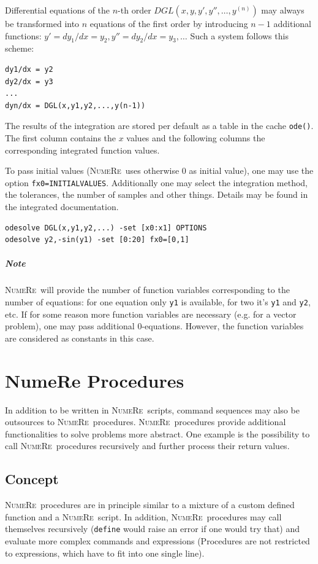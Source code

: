 \documentclass[DIV=14,headsepline,footsepline]{scrbook}
\newcommand{\NR}{\textsc{Nu\-me\-Re}}
\begin{document}
				Differential equations of the $n$-th order $DGL(x,y,y',y'',\ldots,y^{(n)})$ may always be transformed into $n$ equations of the first order by introducing $n-1$ additional functions: $y' = dy_1/dx = y_2, y'' = dy_2/dx = y_3, \ldots$ Such a system follows this scheme:
				\begin{lstlisting}
dy1/dx = y2
dy2/dx = y3
...
dyn/dx = DGL(x,y1,y2,...,y(n-1))
				\end{lstlisting}
	
				The results of the integration are stored per default as a table in the cache \lstinline+ode()+. The first column contains the $x$ values and the following columns the corresponding integrated function values.
				
				To pass initial values (\NR\ uses otherwise 0 as initial value), one may use the option \lstinline+fx0=INITIALVALUES+. Additionally one may select the integration method, the tolerances, the number of samples and other things. Details may be found in the integrated documentation.
				\begin{lstlisting}
odesolve DGL(x,y1,y2,...) -set [x0:x1] OPTIONS
odesolve y2,-sin(y1) -set [0:20] fx0=[0,1]
				\end{lstlisting}
				\paragraph{Note} \NR\ will provide the number of function variables corresponding to the number of equations: for one equation only \lstinline+y1+ is available, for two it's \lstinline+y1+ and \lstinline+y2+, etc. If for some reason more function variables are necessary (e.g. for a vector problem), one may pass additional 0-equations. However, the function variables are considered as constants in this case.
				
		\chapter{NumeRe Procedures}
			In addition to be written in \NR\ scripts, command sequences may also be outsources to \NR\ procedures. \NR\ procedures provide additional functionalities to solve problems more abstract. One example is the possibility to call \NR\ procedures recursively and further process their return values.
			\section{Concept}
				\NR\ procedures are in principle similar to a mixture of a custom defined function and a \NR\ script. In addition, \NR\ procedures may call themselves recursively (\lstinline+define+ would raise an error if one would try that) and evaluate more complex commands and expressions (Procedures are not restricted to expressions, which have to fit into one single line).
				
\end{document}
